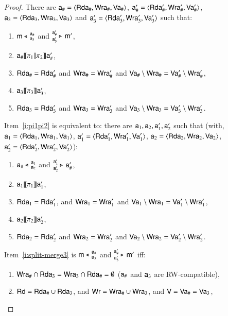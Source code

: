 \begin{proof}
There are %
$\modla_\# = \tuple{\readseta_\#, \writeseta_\#, \valuseta_\#}$, $\modla'_\# = \tuple{\readseta'_\#, \writeseta'_\#, \valuseta'_\#}$, $\modla_3 = \tuple{\readseta_3, \writeseta_3, \valuseta_3}$ and $\modla'_3 = \tuple{\readseta'_3, \writeseta'_3, \valuseta'_3}$
such that:
\begin{enumerate}[resume]
\item\label{i:split-merge3}\label{i:rhsfirst} $\splt{\modl}{\modla_\#} {\modla_3}$
  and $\mrg{\modl'}{\modla'_\#} {\modla'_3}$, 
\item\label{i:pi1pi2} $\modla_\# \intPgm{ \pi_1 \pll \pi_2} \modla'_\#$,
\item $\readseta_\# = \readseta'_\#$
  and $\writeseta_\# = \writeseta'_\#$
  and $\valuseta_\# \setminus \writeseta_\# = \valuseta'_\# \setminus \writeseta'_\#$,
\item $\modla_3 \intPgm{ \pi_3 } \modla'_3$, 
\item $\readseta_3 = \readseta'_3$
  and $\writeseta_3 = \writeseta'_3$ 
  and $\valuseta_3 \setminus \writeseta_3 = \valuseta'_3 \setminus \writeseta'_3$.
\end{enumerate}
Item~\ref{i:pi1pi2} is equivalent to:
there are $\modla_1, \modla_2, \modla'_1, \modla'_2$ such that 
(with, $\modla_1 = \tuple{\readseta_1, \writeseta_1, \valuseta_1}$, $\modla'_1 = \tuple{\readseta'_1, \writeseta'_1, \valuseta'_1}$, $\modla_2 = \tuple{\readseta_2, \writeseta_2, \valuseta_2}$, $\modla'_2 = \tuple{\readseta'_2, \writeseta'_2, \valuseta'_2}$):
\begin{enumerate}[resume]
\item\label{i:split-merge4} $\splt{\modla_\#}{\modla_1} {\modla_2}$
  and $\mrg{\modla'_\#}{\modla'_1} {\modla'_2}$, 
\item $\modla_1 \intPgm{ \pi_1} \modla'_1$,
\item $\readseta_1 = \readseta'_1$,
  and $\writeseta_1 = \writeseta'_1$
  and $\valuseta_1 \setminus \writeseta_1 = \valuseta'_1 \setminus \writeseta'_1$,
\item $\modla_2 \intPgm{ \pi_2 } \modla'_2$, 
\item $\readseta_2 = \readseta'_2$
  and $\writeseta_2 = \writeseta'_2$ 
  and $\valuseta_2 \setminus \writeseta_2 = \valuseta'_2 \setminus \writeseta'_2$.
\end{enumerate}
Item~\ref{i:split-merge3} is $\splt{\modl}{\modla_\#} {\modla_3}$ and $\mrg{\modl'}{\modla'_\#} {\modla'_3}$ iff:
\begin{enumerate}[resume]
\item
  $\writeseta_\# \cap \readseta_3 = \writeseta_3 \cap \readseta_\# = \emptyset$ ($\modla_\#$ and $\modla_3$ are RW-compatible),
  \item 
    $\readset = \readseta_\# \cup \readseta_3 $, and $\writeset = \writeseta_\# \cup \writeseta_3$, and $\valuset = \valuseta_\# = \valuseta_3$,


\end{enumerate}
\end{proof}
